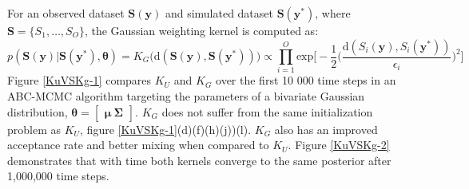 
For an observed dataset $\bm{S}(\bm{y})$ and simulated dataset $\bm{S}(\bm{y^*})$, where $\bm{S} = \{S_1,\dots,S_O\}$, the Gaussian weighting kernel is computed as:
\begin{equation}
p(\bm{S}(\bm{y})|\bm{S}(\bm{y^*}),\bm{\theta}) = K_G\big(\text{d}(\bm{S}(\bm{y}),\bm{S}(\bm{y^*}))\big) \propto \prod_{i = 1}^{O} \text{exp}\Big[-\frac{1}{2}\Big(\frac{\text{d}(S_i(\bm{y}),S_i(\bm{y^*}))}{\epsilon_i}\Big)^2\Big]
\end{equation}
Figure \ref{KuVSKg-1} compares $K_U$ and $K_G$ over the first 10 000 time steps in an ABC-MCMC algorithm targeting the parameters of a bivariate Gaussian distribution, $\bm{\theta} = \begin{bmatrix}
\bm{\mu}\ \bm{\Sigma}
\end{bmatrix}$. $K_G$ does not suffer from the same initialization problem as $K_U$, figure \ref{KuVSKg-1}(d)(f)(h)(j))(l). $K_G$ also has an improved acceptance rate and better mixing when compared to $K_U$. Figure \ref{KuVSKg-2} demonstrates that with time both kernels converge to the same posterior after 1,000,000 time steps.\par

